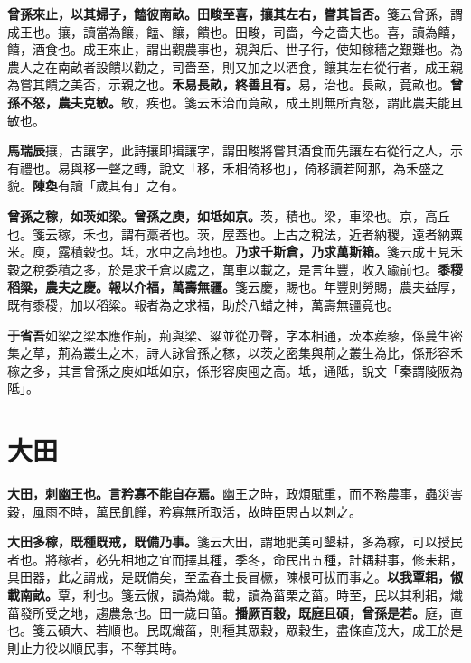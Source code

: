 \textbf{曾孫來止，以其婦子，饁彼南畝。田畯至喜，攘其左右，嘗其旨否。}{\footnotesize 箋云曾孫，謂成王也。攘，讀當為饟，饁、饟，饋也。田畯，司嗇，今之嗇夫也。喜，讀為饎，饎，酒食也。成王來止，謂出觀農事也，親與后、世子行，使知稼穡之艱難也。為農人之在南畝者設饋以勸之，司嗇至，則又加之以酒食，饟其左右從行者，成王親為嘗其饋之美否，示親之也。}\textbf{禾易長畝，終善且有。}{\footnotesize 易，治也。長畝，竟畝也。}\textbf{曾孫不怒，農夫克敏。}{\footnotesize 敏，疾也。箋云禾治而竟畝，成王則無所責怒，謂此農夫能且敏也。}

\begin{quoting}\textbf{馬瑞辰}攘，古讓字，此詩攘即揖讓字，謂田畯將嘗其酒食而先讓左右從行之人，示有禮也。易與移一聲之轉，說文「移，禾相倚移也」，倚移讀若阿那，為禾盛之貌。\textbf{陳奐}有讀「歲其有」之有。\end{quoting}

\textbf{曾孫之稼，如茨如梁。曾孫之庾，如坻如京。}{\footnotesize 茨，積也。梁，車梁也。京，高丘也。箋云稼，禾也，謂有藁者也。茨，屋蓋也。上古之稅法，近者納稯，遠者納粟米。庾，露積穀也。坻，水中之高地也。}\textbf{乃求千斯倉，乃求萬斯箱。}{\footnotesize 箋云成王見禾穀之稅委積之多，於是求千倉以處之，萬車以載之，是言年豐，收入踰前也。}\textbf{黍稷稻粱，農夫之慶。報以介福，萬壽無疆。}{\footnotesize 箋云慶，賜也。年豐則勞賜，農夫益厚，既有黍稷，加以稻粱。報者為之求福，助於八蜡之神，萬壽無疆竟也。}

\begin{quoting}\textbf{于省吾}如梁之梁本應作荊，荊與梁、粱並從刅聲，字本相通，茨本蒺藜，係蔓生密集之草，荊為叢生之木，詩人詠曾孫之稼，以茨之密集與荊之叢生為比，係形容禾稼之多，其言曾孫之庾如坻如京，係形容庾囤之高。坻，通阺，說文「秦謂陵阪為阺」。\end{quoting}

\section{大田}


\textbf{大田，刺幽王也。言矜寡不能自存焉。}{\footnotesize 幽王之時，政煩賦重，而不務農事，蟲災害穀，風雨不時，萬民飢饉，矜寡無所取活，故時臣思古以刺之。}

\textbf{大田多稼，既種既戒，既備乃事。}{\footnotesize 箋云大田，謂地肥美可墾耕，多為稼，可以授民者也。將稼者，必先相地之宜而擇其種，季冬，命民出五種，計耦耕事，修耒耜，具田器，此之謂戒，是既備矣，至孟春土長冒橛，陳根可拔而事之。}\textbf{以我覃耜，俶載南畝。}{\footnotesize 覃，利也。箋云俶，讀為熾。載，讀為菑栗之菑。時至，民以其利耜，熾菑發所受之地，趨農急也。田一歲曰菑。}\textbf{播厥百穀，既庭且碩，曾孫是若。}{\footnotesize 庭，直也。箋云碩大、若順也。民既熾菑，則種其眾穀，眾穀生，盡條直茂大，成王於是則止力役以順民事，不奪其時。}

